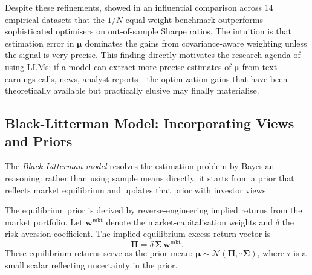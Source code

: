 Despite these refinements, \citet{demiguel2009optimal} showed in an influential comparison
across 14 empirical datasets that the $1/N$ equal-weight benchmark outperforms sophisticated
optimisers on out-of-sample Sharpe ratios. The intuition is that estimation error in
$\boldsymbol{\mu}$ dominates the gains from covariance-aware weighting unless the signal
is very precise. This finding directly motivates the research agenda of using LLMs:
if a model can extract more precise estimates of $\boldsymbol{\mu}$ from text---earnings
calls, news, analyst reports---the optimization gains that have been theoretically
available but practically elusive may finally materialise.

\subsection{Black-Litterman Model: Incorporating Views and Priors}
\label{sec:ch10-black-litterman}

The \emph{Black-Litterman model} \citep{blacklitterman1992} resolves the estimation
problem by Bayesian reasoning: rather than using sample means directly, it starts from a
prior that reflects market equilibrium and updates that prior with investor views.

The equilibrium prior is derived by reverse-engineering implied returns from the market
portfolio. Let $\mathbf{w}^{\text{mkt}}$ denote the market-capitalisation weights and
$\delta$ the risk-aversion coefficient. The implied equilibrium excess-return vector is
\begin{equation}
  \boldsymbol{\Pi} = \delta\, \boldsymbol{\Sigma}\, \mathbf{w}^{\text{mkt}}.
  \label{eq:ch10-bl-pi}
\end{equation}
These equilibrium returns serve as the prior mean: $\boldsymbol{\mu} \sim
\mathcal{N}(\boldsymbol{\Pi}, \tau\boldsymbol{\Sigma})$, where $\tau$ is a small scalar
reflecting uncertainty in the prior.

